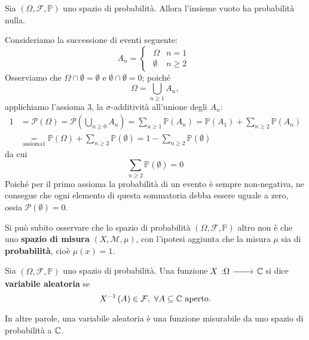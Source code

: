 \begin{proposition}
	Sia $\left(\Omega,\mathcal{F},\mathbb{P}\right)$ uno spazio di probabilità. Allora l'insieme vuoto ha probabilità nulla.
\end{proposition}
\begin{demonstration}
	Consideriamo la successione di eventi seguente:
	\begin{equation*}
		A_n=\begin{cases}
			\begin{array}{ll}
				\Omega&n=1\\
				\emptyset&n\geq2
			\end{array}
		\end{cases}
	\end{equation*}
	Osserviamo che $\Omega\cap \emptyset=\emptyset$ e $\emptyset\cap\emptyset=0$; poiché
	\begin{equation*}
		\Omega=\bigcup_{n\geq 1}A_n,
	\end{equation*}
	applichiamo l'assioma 3, la $\sigma$-additività all'unione degli $A_n$:
	\begin{align*}
		1&=\mathcal{P}\left(\Omega\right)=\mathcal{P}\left(\bigcup_{n\geq 0}A_n\right)=\sum_{n\geq 1}\mathbb{P}\left(A_n\right)=\mathbb{P}\left(A_1\right)+\sum_{n\geq2}\mathbb{P}\left(A_n\right)\\
		&\underset{\text{assioma} 1}{=}\mathbb{P}\left(\Omega\right)+\sum_{n\geq 2}\mathbb{P}\left(\emptyset\right)=1-\sum_{n\geq 2}\mathbb{P}\left(\emptyset\right)
	\end{align*}
	da cui
	\begin{equation*}
		\sum_{n\geq 2}\mathbb{P}\left(\emptyset\right)=0
	\end{equation*}
	Poiché per il primo assioma la probabilità di un evento è sempre non-negativa, ne consegue che ogni elemento di questa sommatoria debba essere uguale a zero, ossia $\mathcal{P}\left(\emptyset\right)=0$.
\end{demonstration}
Si può subito osservare che lo spazio di probabilità $\left(\Omega,\mathcal{F},\mathbb{P}\right)$ altro non è che uno \textbf{spazio di misura} $\left(X,\mathcal{M},\mu\right)$, con l'ipotesi aggiunta che la misura $\mu$ sia di \textbf{probabilità}, cioè $\mu(x)=1$.
\begin{define}
	Sia $\left(\Omega,\mathcal{F},\mathbb{P}\right)$ uno spazio di probabilità. Una funzione $\funz{X}{\Omega}{\complexset}$ si dice \textbf{variabile aleatoria} se \begin{equation}
		X^{-1}\left(A\right)\in\mathcal{F},\ \forall A\subseteq \mathbb{C}\text{ aperto.}
	\end{equation}
\end{define}
In altre parole, una variabile aleatoria è una funzione misurabile da uno spazio di probabilità a $\mathbb{C}$.

